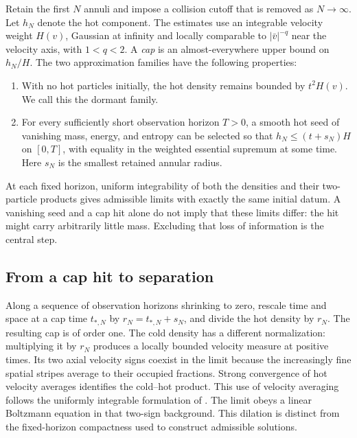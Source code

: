Retain the first \(N\) annuli and impose a collision cutoff that is
removed as \(N\to\infty\). Let \(h_N\) denote the hot component.
The estimates use an integrable velocity weight \(H(v)\), Gaussian at
infinity and locally comparable to \(|\bar v|^{-q}\) near the velocity axis,
with \(1<q<2\). A \emph{cap} is an almost-everywhere upper bound on
\(h_N/H\). The two approximation families have the following properties:
\begin{enumerate}
\item With no hot particles initially, the hot density remains bounded
by \(t^2H(v)\). We call this the dormant family.
\item For every sufficiently short observation horizon \(T>0\), a
smooth hot seed of vanishing mass, energy, and entropy can be selected
so that \(h_N\le(t+s_N)H\) on \([0,T]\), with equality in the
weighted essential supremum at some time. Here \(s_N\) is the smallest
retained annular radius.
\end{enumerate}
At each fixed horizon, uniform integrability of both the densities and
their two-particle products gives admissible limits with exactly the
same initial datum. A vanishing seed and a cap hit alone do not imply
that these limits differ: the hit might carry arbitrarily little mass.
Excluding that loss of information is the central step.

\subsection{From a cap hit to separation}

Along a sequence of observation horizons shrinking to zero, rescale
time and space at a cap time \(t_{*,N}\) by \(r_N=t_{*,N}+s_N\),
and divide the hot density by \(r_N\).
The resulting cap is of order one. The cold density has a different
normalization: multiplying it by \(r_N\) produces a locally bounded velocity measure
at positive times. Its two axial velocity signs coexist in the limit because
the increasingly fine spatial stripes average to their occupied
fractions. Strong convergence of hot velocity averages identifies the
cold--hot product. This use of velocity averaging follows the
uniformly integrable formulation of
\cite[Proposition~3]{GolseLionsPerthameSentis1988}.
The limit obeys a linear Boltzmann equation in that two-sign background.
This dilation is distinct from the fixed-horizon compactness used to
construct admissible solutions.

